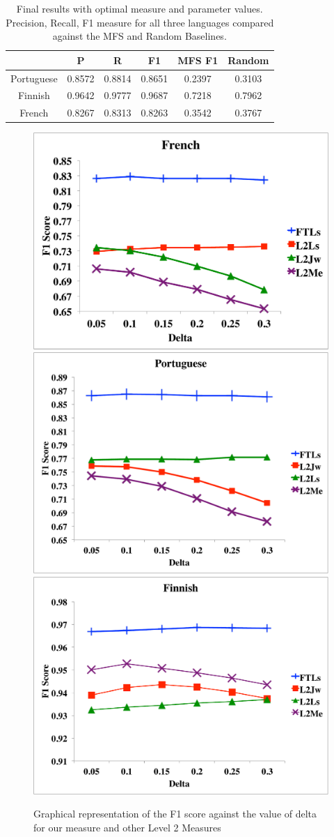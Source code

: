 \documentclass[10pt, a4paper]{article}
\begin{document}
\begin{table}
{\centering \footnotesize
\begin{tabular}{|c|c|c|c|c|c|}
\hline &P&R&F1&MFS F1&Random\\
\hline Portuguese&0.8572&0.8814&0.8651&0.2397&0.3103\\
\hline Finnish&0.9642&0.9777&0.9687&0.7218&0.7962\\
\hline French&0.8267&0.8313&0.8263&0.3542&0.3767\\
\hline 
\end{tabular}
\caption{Final results with optimal measure and parameter values. Precision, Recall, F1 measure for all three languages compared against the MFS and Random Baselines.}
\label{tab:final}
}
\end{table} 

\begin{figure}
\centering
\includegraphics[width=.65\columnwidth]{french}
\includegraphics[width=.65\columnwidth]{portuguese}
\includegraphics[width=.65\columnwidth]{finnish}
\caption{Graphical representation of the F1 score against the  value of delta for our measure and other Level 2 Measures}
\label{fig.2}
\end{figure}
\end{document}
